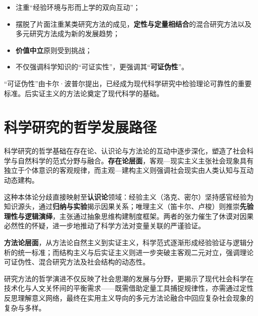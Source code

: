 \begin{itemize}
    \item 注重“经验环境与形而上学的双向互动”；
    \item 摆脱了片面注重某类研究方法的成见，\textbf{定性与定量相结合}的混合研究方法以及多元研究方法成为新的发展趋势；
    \item \textbf{价值中立}原则受到挑战；
    \item 不仅强调科学知识的“可证实性”，更强调其“\textbf{可证伪性}”。
\end{itemize}

“可证伪性”由卡尔·波普尔提出，已经成为现代科学研究中检验理论可靠性的重要标准。后实证主义的方法论奠定了现代科学的基础。

\section{科学研究的哲学发展路径}

科学研究的哲学基础在存在论、认识论与方法论的互动中逐步深化，塑造了社会科学与自然科学的范式分野与融合。\textbf{存在论层面}，客观---现实主义主张社会现象具有独立于个体意识的客观规律，而主观---建构主义则强调社会现实由人类认知与互动动态建构。

这种本体论分歧直接映射至\textbf{认识论}领域：经验主义（洛克、密尔）坚持感官经验为知识源头，通过\textbf{归纳与实验}揭示因果关系；唯理主义（笛卡尔、卢梭）则推崇\textbf{先验理性与逻辑演绎}，主张通过抽象思维构建制度框架。两者的张力催生了休谟对因果必然性的怀疑，进一步地推动了科学方法对变量关联的严谨验证。

\textbf{方法论层面}，从方法论自然主义到实证主义，科学范式逐渐形成经验验证与逻辑分析的统一标准；而结构主义与后实证主义则进一步突破主客观二元对立，强调理论可证伪性、混合研究方法及社会结构的动态性。

研究方法的哲学演进不仅反映了社会思潮的发展与分野，更揭示了现代社会科学在技术化与人文关怀间的平衡需求------既需借助定量工具捕捉规律性，亦需通过定性反思理解意义网络，最终在实用主义导向的多元方法论融合中回应复杂社会现象的复杂与多样。


